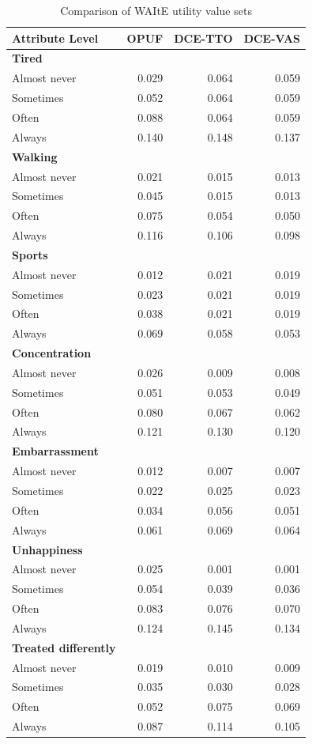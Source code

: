 \documentclass[
  letterpaper,
  DIV=11,
  numbers=noendperiod]{scrartcl}
\begin{document}
\begin{longtable}[]{@{}lrrr@{}}

\caption{\label{tbl-WAItEvalsets}Comparison of WAItE utility value sets}

\tabularnewline

\toprule\noalign{}
Attribute Level & OPUF & DCE-TTO & DCE-VAS \\
\midrule\noalign{}
\endhead
\bottomrule\noalign{}
\endlastfoot
\textbf{Tired} & \textbf{} & \textbf{} & \textbf{} \\
Almost never & 0.029 & 0.064 & 0.059 \\
Sometimes & 0.052 & 0.064 & 0.059 \\
Often & 0.088 & 0.064 & 0.059 \\
Always & 0.140 & 0.148 & 0.137 \\
\textbf{Walking} & \textbf{} & \textbf{} & \textbf{} \\
Almost never & 0.021 & 0.015 & 0.013 \\
Sometimes & 0.045 & 0.015 & 0.013 \\
Often & 0.075 & 0.054 & 0.050 \\
Always & 0.116 & 0.106 & 0.098 \\
\textbf{Sports} & \textbf{} & \textbf{} & \textbf{} \\
Almost never & 0.012 & 0.021 & 0.019 \\
Sometimes & 0.023 & 0.021 & 0.019 \\
Often & 0.038 & 0.021 & 0.019 \\
Always & 0.069 & 0.058 & 0.053 \\
\textbf{Concentration} & \textbf{} & \textbf{} & \textbf{} \\
Almost never & 0.026 & 0.009 & 0.008 \\
Sometimes & 0.051 & 0.053 & 0.049 \\
Often & 0.080 & 0.067 & 0.062 \\
Always & 0.121 & 0.130 & 0.120 \\
\textbf{Embarrassment} & \textbf{} & \textbf{} & \textbf{} \\
Almost never & 0.012 & 0.007 & 0.007 \\
Sometimes & 0.022 & 0.025 & 0.023 \\
Often & 0.034 & 0.056 & 0.051 \\
Always & 0.061 & 0.069 & 0.064 \\
\textbf{Unhappiness} & \textbf{} & \textbf{} & \textbf{} \\
Almost never & 0.025 & 0.001 & 0.001 \\
Sometimes & 0.054 & 0.039 & 0.036 \\
Often & 0.083 & 0.076 & 0.070 \\
Always & 0.124 & 0.145 & 0.134 \\
\textbf{Treated differently} & \textbf{} & \textbf{} & \textbf{} \\
Almost never & 0.019 & 0.010 & 0.009 \\
Sometimes & 0.035 & 0.030 & 0.028 \\
Often & 0.052 & 0.075 & 0.069 \\
Always & 0.087 & 0.114 & 0.105 \\


\end{longtable}
\end{document}

